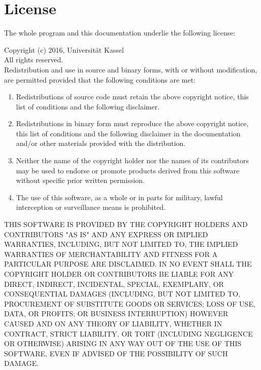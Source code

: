 
\chapter*{License}

The whole program and this documentation underlie the following license:

Copyright (c) 2016, Universität Kassel\\
All rights reserved.\\
Redistribution and use in source and binary forms, with or without modification, are permitted provided that the following conditions are met:\\
\begin{enumerate}
 \item Redistributions of source code must retain the above copyright notice, this list of conditions and the following disclaimer.
 \item Redistributions in binary form must reproduce the above copyright notice, 
 this list of conditions and the following disclaimer in the documentation and/or other materials provided with the distribution.
 \item Neither the name of the copyright holder nor the names of its contributors may be used to endorse or promote 
 products derived from this software without specific prior written permission.
 \item The use of this software, as a whole or in parts for military, lawful interception or surveillance means is prohibited.
\end{enumerate}
THIS SOFTWARE IS PROVIDED BY THE COPYRIGHT HOLDERS AND CONTRIBUTORS "AS IS" AND ANY EXPRESS OR IMPLIED WARRANTIES, INCLUDING, BUT NOT 
LIMITED TO, THE IMPLIED WARRANTIES OF MERCHANTABILITY AND 
FITNESS FOR A PARTICULAR PURPOSE ARE DISCLAIMED. IN NO EVENT SHALL THE COPYRIGHT HOLDER OR CONTRIBUTORS BE LIABLE FOR ANY DIRECT, 
INDIRECT, INCIDENTAL, SPECIAL, EXEMPLARY, OR CONSEQUENTIAL DAMAGES (INCLUDING, BUT NOT LIMITED TO, 
PROCUREMENT OF SUBSTITUTE GOODS OR SERVICES; LOSS OF USE, DATA, OR PROFITS; OR BUSINESS INTERRUPTION) HOWEVER CAUSED AND ON ANY THEORY 
OF LIABILITY, WHETHER IN CONTRACT, STRICT LIABILITY, OR TORT (INCLUDING NEGLIGENCE OR OTHERWISE) 
ARISING IN ANY WAY OUT OF THE USE OF THIS SOFTWARE, EVEN IF ADVISED OF THE POSSIBILITY OF SUCH DAMAGE.
